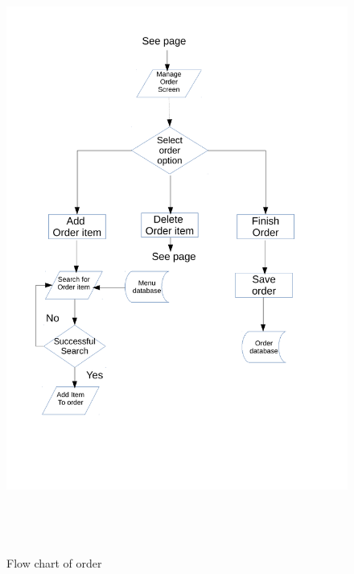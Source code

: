 \begin{figure}[H]
    \includegraphics[height = 20cm]{./Design/Images/flowchart2}
    \caption{Flow chart of order} \label{fig:Flowchart2}
\end{figure}

